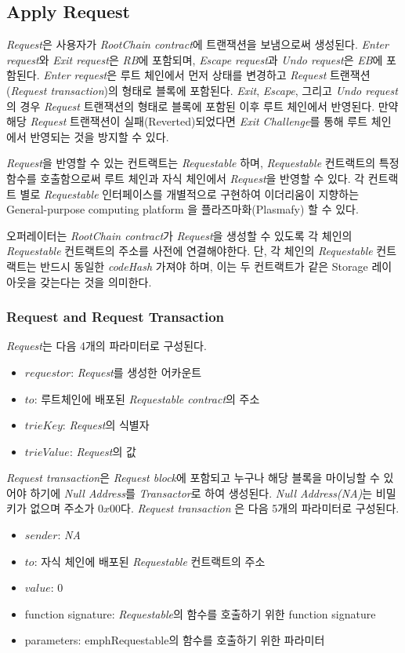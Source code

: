 \documentclass[letterpaper, 11pt]{article}
\begin{document}
\subsection{Apply Request}
\begin{CJK}{UTF8}{mj}
\emph{Request}은 사용자가 \emph{RootChain contract}에 트랜잭션을 보냄으로써 생성된다. \emph{Enter request}와 \emph{Exit request}은 \emph{RB}에 포함되며, \emph{Escape request}과 \emph{Undo request}은 \emph{EB}에 포함된다. \emph{Enter request}은 루트 체인에서 먼저 상태를 변경하고 \emph{Request} 트랜잭션(\emph{Request transaction})의 형태로 블록에 포함된다. \emph{Exit}, \emph{Escape}, 그리고 \emph{Undo request}의 경우 \emph{Request} 트랜잭션의 형태로 블록에 포함된 이후 루트 체인에서 반영된다. 만약 해당 \emph{Request} 트랜잭션이 실패(Reverted)되었다면 \emph{Exit Challenge}를 통해 루트 체인에서 반영되는 것을 방지할 수 있다.

\emph{Request}을 반영할 수 있는 컨트랙트는 \emph{Requestable} 하며, \emph{Requestable} 컨트랙트의 특정 함수를 호출함으로써 루트 체인과 자식 체인에서 \emph{Request}을 반영할 수 있다. 각 컨트랙트 별로 \emph{Requestable} 인터페이스를 개별적으로 구현하여 이더리움이 지향하는 General-purpose computing platform 을 플라즈마화(Plasmafy) 할 수 있다.

오퍼레이터는 \emph{RootChain contract}가 \emph{Request}을 생성할 수 있도록 각 체인의 \emph{Requestable} 컨트랙트의 주소를 사전에 연결해야한다. 단, 각 체인의 \emph{Requestable} 컨트랙트는 반드시 동일한 \emph{codeHash} 가져야 하며, 이는 두 컨트랙트가 같은 Storage 레이아웃을 갖는다는 것을 의미한다.

\subsubsection{Request and Request Transaction}
\begin{CJK}{UTF8}{mj}
\emph{Request}는 다음 4개의 파라미터로 구성된다.
\begin{itemize}
\item $requestor$: \emph{Request}를 생성한 어카운트
\item $to$: 루트체인에 배포된 \emph{Requestable contract}의 주소
\item $trieKey$: \emph{Request}의 식별자
\item $trieValue$: \emph{Request}의 값
\end{itemize}

\emph{Request transaction}은 \emph{Request block}에 포함되고 누구나 해당 블록을 마이닝할 수 있어야 하기에 \emph{Null Address}를 \emph{Transactor}로 하여 생성된다. \emph{Null Address(NA)}는 비밀키가 없으며 주소가 $0x00$다.
\emph{Request transaction} 은 다음 5개의 파라미터로 구성된다.
\begin{itemize}
\item $sender$: \emph{NA}
\item $to$: 자식 체인에 배포된 \emph{Requestable} 컨트랙트의 주소
\item $value$: 0
\item function signature: \emph{Requestable}의 함수를 호출하기 위한 function signature
\item parameters: emph{Requestable}의 함수를 호출하기 위한 파라미터
\end{itemize}


\end{CJK}
\end{CJK}
\end{document}
